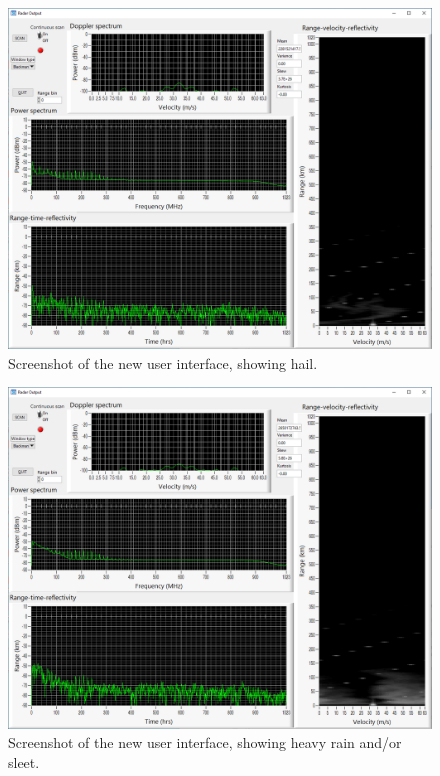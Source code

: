 \documentclass{article}
\begin{document}
\begin{figure}
	\centering
	\includegraphics[width=\textwidth]{working-hail}
	\caption{Screenshot of the new user interface, showing hail.}
	\label{fig:WorkingHail}
\end{figure}

\begin{figure}
	\centering
	\includegraphics[width=\textwidth]{working-heavy-rain-snow}
	\caption{Screenshot of the new user interface, showing heavy rain and/or sleet.}
	\label{fig:WorkingHeavyRainSnow}
\end{figure}
\end{document}
